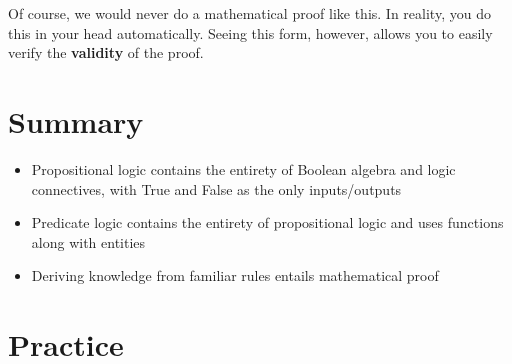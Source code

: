 \documentclass[main.tex]{subfiles}
\begin{document}
Of course, we would never do a mathematical proof like this. In reality, you do this in your head automatically. Seeing this form, however, allows you to easily verify the \textbf{validity} of the proof.

\section{Summary}

\begin{itemize}
	\item Propositional logic contains the entirety of Boolean algebra and logic connectives, with True and False as the only inputs/outputs
	\item Predicate logic contains the entirety of propositional logic and uses functions along with entities
	\item Deriving knowledge from familiar rules entails mathematical proof
\end{itemize}

\section{Practice}
\end{document}
